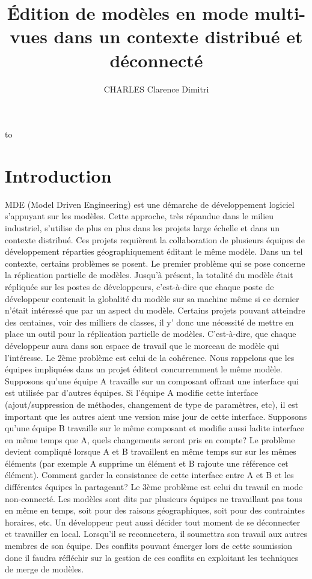 \documentclass[a4paper,14pt]{article}
\title{Édition de modèles en mode multi-vues dans un contexte distribué et déconnecté}
\author{CHARLES Clarence Dimitri}
\makeatletter
\def\maketitle{%
  \thispagestyle{empty}\vbox to \vsize{%
    \vfill
    \vspace{1cm}
    \begin{flushleft}
      \usefont{OT1}{ptm}{m}{n}
      \huge \@title
    \end{flushleft}
    \par
    \hrule height 4pt
    \par
    \begin{flushright}
      \usefont{OT1}{phv}{m}{n}
      \Large \@author
      \par
    \end{flushright}
    \vspace{1cm}
    \vfill
    \vfill
    \bf{Le \@date}
  }%
  \cleardoublepage
}
\makeatother
\begin{document}
\maketitle
\tableofcontents
\cleardoublepage

\section{Introduction}
MDE (Model Driven Engineering) est une démarche de développement logiciel s'appuyant sur les modèles. Cette approche, très répandue dans le milieu industriel, s'utilise de plus en plus dans les projets  large échelle et dans un contexte distribué. Ces projets requièrent la collaboration de plusieurs équipes de développement réparties géographiquement éditant le même modèle. Dans un tel contexte, certains problèmes se posent. \newline
Le premier problème qui se pose concerne la réplication partielle de modèles. Jusqu'à présent, 
la totalité du modèle était répliquée sur les postes de développeurs, c'est-à-dire que chaque poste de développeur contenait la globalité du modèle sur sa machine 
même si ce dernier n'était intéressé que par un aspect du modèle. Certains projets pouvant atteindre des centaines, voir des milliers de classes, il y' donc une nécessité de mettre en place
un outil pour la réplication partielle de modèles. C'est-à-dire, que chaque développeur aura dans son espace de travail que le morceau de modèle qui l'intéresse.
Le 2ème problème est celui de la cohérence. Nous rappelons que les équipes impliquées dans un projet éditent concurremment le même modèle. Supposons qu'une équipe A travaille sur un
composant offrant une interface qui est utilisée par d'autres équipes. Si l'équipe A modifie cette interface (ajout/suppression de méthodes, changement de type de paramètres, etc), 
il est important que les autres aient une version mise  jour de cette interface. Supposons qu'une équipe B travaille sur le même composant et 
modifie aussi ladite interface en même temps que A, quels changements
seront pris en compte? Le problème devient compliqué lorsque A et B travaillent en même temps sur sur les mêmes éléments (par exemple A supprime un élément et B rajoute une référence  cet élément). Comment garder la consistance de cette interface entre A et B et les différentes équipes la partageant?
Le 3ème problème est celui du travail en mode non-connecté. Les modèles sont dits par plusieurs équipes ne travaillant pas tous en même en temps, soit pour des raisons géographiques, soit pour des contraintes horaires, etc. Un développeur peut aussi décider  tout moment de se déconnecter et travailler en local. Lorsqu'il se reconnectera, il soumettra son travail aux autres membres de son équipe. Des conflits pouvant émerger lors de cette soumission donc il faudra réfléchir sur la gestion de ces conflits en exploitant les techniques de merge de modèles.
\end{document}
